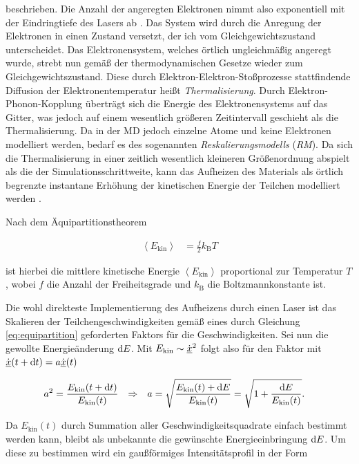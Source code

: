 		beschrieben. Die Anzahl der angeregten Elektronen nimmt also exponentiell mit der
		Eindringtiefe des Lasers ab \cite{klein2013klassische}. Das System wird durch die Anregung
		der Elektronen in einen Zustand versetzt, der ich vom Gleichgewichtszustand unterscheidet.
		Das Elektronensystem, welches örtlich ungleichmäßig angeregt wurde, strebt nun gemäß der
		thermodynamischen Gesetze wieder zum Gleichgewichtszustand. Diese durch
		Elektron-Elektron-Stoßprozesse stattfindende Diffusion der Elektronentemperatur heißt
		\emph{Thermalisierung}. Durch Elektron-Phonon-Kopplung überträgt sich die Energie des
		Elektronensystems auf das Gitter, was jedoch auf einem wesentlich größeren Zeitintervall
		geschieht als die Thermalisierung. Da in der MD jedoch einzelne Atome und keine Elektronen
		modelliert werden, bedarf es des sogenannten \emph{Reskalierungsmodells} (\emph{RM}).
		Da sich die Thermalisierung in einer zeitlich wesentlich kleineren Größenordnung abspielt
		als die der Simulationsschrittweite, kann das Aufheizen des Materials als örtlich begrenzte
		instantane Erhöhung der kinetischen Energie der Teilchen modelliert werden
		\cite{klein2013klassische}.

		Nach dem Äquipartitionstheorem

		\begin{align}
			\left\langle E_\text{kin} \right\rangle &= \frac{f}{2} k_\text{B} T
				\label{eq:equipartition}
		\end{align}

		ist hierbei die mittlere kinetische Energie $\left\langle E_\text{kin} \right\rangle$
		proportional zur Temperatur $T$, wobei $f$ die Anzahl der Freiheitsgrade und
		$k_\text{B}$ die Boltzmannkonstante ist.

		Die wohl direkteste Implementierung des Aufheizens durch einen Laser ist das Skalieren
		der Teilchengeschwindigkeiten gemäß eines durch Gleichung \eqref{eq:equipartition}
		geforderten Faktors für die Geschwindigkeiten. Sei nun die gewollte Energieänderung
		$\dx[E]$. Mit $E_\text{kin} \sim \dot{\uvec{x}}^2$ folgt also für den Faktor mit
		$\dot{\uvec{x}}(t + \dt) = a\dot{\uvec{x}}(t)$

		\begin{align}
			a^2 &= \frac{E_\text{kin}(t + \dt)}{E_\text{kin}(t)}
			&\Rightarrow&&
			a &= \sqrt{\frac{E_\text{kin}(t) + \dx[E]}{E_\text{kin}(t)}}
				= \sqrt{1 + \frac{\dx[E]}{E_\text{kin}(t)}}
			.
			\label{eq:factor}
		\end{align}

		Da $E_\text{kin}(t)$ durch Summation aller Geschwindigkeitsquadrate einfach bestimmt
		werden kann, bleibt als unbekannte die gewünschte Energieeinbringung $\dx[E]$. Um diese
		zu bestimmen wird ein gaußförmiges Intensitätsprofil in der Form

